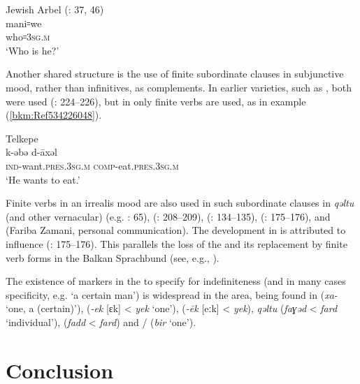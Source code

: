 \documentclass[output=paper]{langsci/langscibook}
\begin{document}
\ea\label{bkm:Ref534225903}Jewish Arbel  (\citealt{Jastrow1990book}: 37, 46) \\
\gll mani꞊we\\
     who꞊\textsc{3sg.m}\\
\glt ‘Who is he?’\z

Another shared structure is the use of finite subordinate clauses in subjunctive mood, rather than infinitives, as complements. In earlier  varieties, such as  , both were used (\citealt{Nöldeke1904Syriac}: 224–226), but in  only finite verbs are used, as in example (\ref{bkm:Ref534226048}).

\ea\label{bkm:Ref534226048} Telkepe \\
\gll k-əbə       d-āxəl\\
    \textsc{ind-}\textup{want.}\textsc{pres}.\textsc{3sg.m} \textsc{comp}\textup{{}-eat.}\textsc{pres}.\textsc{3sg.m}\\
\glt ‘He wants to eat.’\z

Finite verbs in an irrealis mood are also used in such subordinate clauses in \textit{qəltu} (and other vernacular)  (e.g. \citealt{Jastrow1990book}: 65),   (\citealt{MacKenzie1961}: 208–209),  (\citealt{MacKenzie1961}: 134–135),   (\citealt{Bulut2007}: 175–176), and   (Fariba Zamani, personal communication). The development in  is attributed to  influence (\citealt{Bulut2007}: 175–176). This parallels the loss of the  and its replacement by finite verb forms in the Balkan Sprachbund (see, e.g., \citealt{Joseph2009}).

The existence of markers in the  to specify for indefiniteness (and in many cases specificity, e.g. ‘a certain man’) is widespread in the area, being found in  (\textit{xa-} ‘one, a (certain)’),   (\textit{\nobreakdash-ek} [ɛk] < \textit{yek} `one'),  (\textit{\nobreakdash-ēk} [eːk] < \textit{yek}), \textit{qəltu}  (\textit{faɣəd} < \textit{fard} `individual'),   (\textit{fadd} < \textit{fard}) and / (\textit{bir} `one').


\section{Conclusion}
\end{document}
